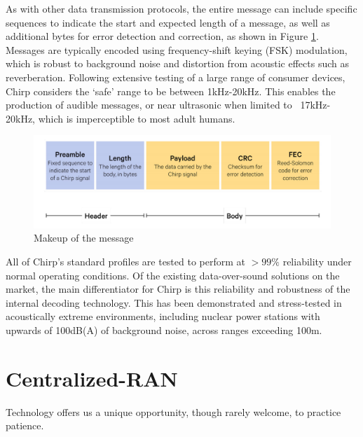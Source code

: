 \documentclass[notitlepage,hidelinks]{article}
\begin{document}
As with other data transmission protocols, the entire message can include
specific sequences to indicate the start and expected length of a message, as
well as additional bytes for error detection and correction, as shown in Figure
\ref{fig:dos_message}. Messages are typically encoded using frequency-shift
keying (FSK) modulation, which is robust to background noise and distortion
from acoustic effects such as reverberation. Following extensive testing of a
large range of consumer devices, Chirp considers the ‘safe’ range to be between
1kHz-20kHz. This enables the production of audible messages, or near ultrasonic
when limited to ~17kHz-20kHz, which is imperceptible to most adult humans. 

\begin{figure}[!h]
  \includegraphics[width=\linewidth]{res/dos_message.png}
    \caption{Makeup of the message}
  \label{fig:dos_message}
\end{figure}

All of Chirp’s standard profiles are tested to perform at $>99\%$ reliability
under normal operating conditions. Of the existing data-over-sound solutions
on the market, the main differentiator for Chirp is this reliability and
robustness of the internal decoding technology. This has been demonstrated and
stress-tested in acoustically extreme environments, including nuclear power
stations with upwards of 100dB(A) of background noise, across ranges exceeding
100m.

\nocite{chirp17}
\printbibliography[heading=subbibliography]


\newpage
\section{Centralized-RAN}

\epigraph{Technology offers us a unique opportunity, 
though rarely welcome, to practice patience.}
{\parencite{patience12}}

\end{document}
